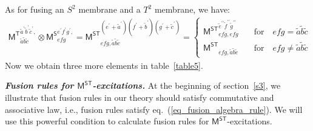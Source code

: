 \documentclass[11pt,nofootinbib,preprint]{revtex4-1}
\begin{document}
As for fusing an $S^2$ membrane and a $T^2$ membrane, we have:
\begin{align}
	\mathsf{M^T}_{\tilde{a}\tilde{b}\tilde{c}}^{\tilde{a}^{\prime}\tilde{b}^{\prime}\tilde{c}^{\prime},}\otimes \mathsf{M^S}_{efg}^{e^{\prime}f^{\prime}g^{\prime},}=\mathsf{M^{ST}}_{efg,\tilde{a}\tilde{b}\tilde{c}}^{\left( e^{\prime}+\tilde{a}^{\prime} \right) \left( f^{\prime}+\tilde{b}^{\prime} \right) \left( g^{\prime}+\tilde{c}^{\prime} \right)}=\begin{cases}
		\mathsf{M^{ST}}_{efg,efg}^{\tilde{e}^{\prime \prime}\tilde{f}^{\prime \prime}\tilde{g}^{\prime \prime}}&\quad\text{for}\quad efg=\tilde{a}\tilde{b}\tilde{c}\\
		\mathsf{M^{ST}}_{efg,\tilde{a}\tilde{b}\tilde{c}}&\quad\text{for}\quad efg\ne \tilde{a}\tilde{b}\tilde{c}
	\end{cases}
\end{align}
Now we obtain three more elements in table~\ref{table5}.

\textbf{\textit{Fusion rules for $\mathsf{M^{ST}}$-excitations.}}
At the beginning of section~\ref{s3}, we illustrate that fusion rules in our theory should satisfy commutative and associative law, i.e., fusion rules satisfy eq.~(\ref{eq_fusion_algebra_rule}). We will use this powerful condition to calculate fusion rules for $\mathsf{M^{ST}}$-excitations. 
\end{document}
